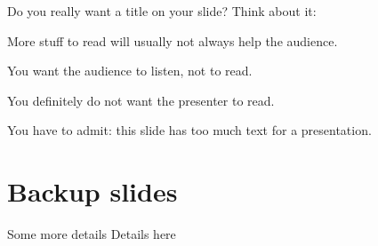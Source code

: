 \documentclass[aspectratio=169]{beamer}
\begin{document}
\begin{frame}{Do you really want a title on your slide?}
    Think about it:
    \begin{vfilleditems}
        \item
        More stuff to read will usually not always help the audience.
        \item
        You want the audience to listen, not to read.
        \item
        You definitely do not want the presenter to read.
    \end{vfilleditems}
    You have to admit: this slide has too much text for a presentation.
\end{frame}


\appendix
\begin{frame}[plain]
\end{frame}
\section{Backup slides}

\begin{frame}{Some more details}
    Details here
\end{frame}
\end{document}
